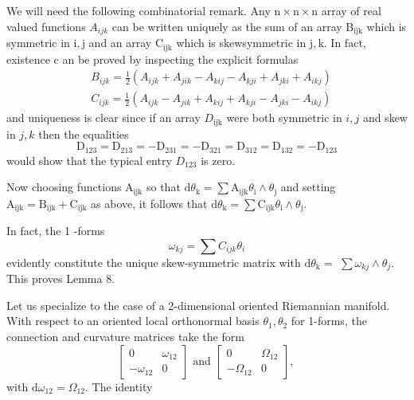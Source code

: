 \documentclass[10pt]{article}
\begin{document}
We will need the following combinatorial remark. Any $\mathrm{n} \times \mathrm{n} \times \mathrm{n}$ array of real valued functions $A_{i j k}$ can be written uniquely as the sum of an array $\mathrm{B}_{\mathrm{ijk}}$ which is symmetric in $\mathrm{i}, \mathrm{j}$ and an array $\mathrm{C}_{\mathrm{ijk}}$ which is skewsymmetric in $\mathrm{j}, \mathrm{k}$. In $\mathrm{fact}$, existence $\mathrm{c}$ an be proved by inspecting the explicit formulas
$$
\begin{aligned}
&B_{i j k}=\frac{1}{2}\left(A_{i j k}+A_{j i k}-A_{k i j}-A_{k j i}+A_{j k i}+A_{i k j}\right) \\
&C_{i j k}=\frac{1}{2}\left(A_{i j k}-A_{j i k}+A_{k i j}+A_{k j i}-A_{j k i}-A_{i k j}\right)
\end{aligned}
$$
and uniqueness is clear since if an array $D_{\mathrm{ijk}}$ were both symmetric in $i, j$ and skew in $j, k$ then the equalities
$$
\mathrm{D}_{123}=\mathrm{D}_{213}=-\mathrm{D}_{231}=-\mathrm{D}_{321}=\mathrm{D}_{312}=\mathrm{D}_{132}=-\mathrm{D}_{123}
$$
would show that the typical entry $D_{123}$ is zero.

Now choosing functions $\mathrm{A}_{\mathrm{ijk}}$ so that $\mathrm{d} \theta_{\mathrm{k}}=\sum \mathrm{A}_{\mathrm{ijk}} \theta_{\mathrm{i}} \wedge \theta_{\mathrm{j}}$ and setting $\mathrm{A}_{\mathrm{ijk}}=\mathrm{B}_{\mathrm{ijk}}+\mathrm{C}_{\mathrm{ijk}}$ as above, it follows that $\mathrm{d} \theta_{\mathrm{k}}=\sum \mathrm{C}_{\mathrm{ijk}} \theta_{\mathrm{i}} \wedge \theta_{\mathrm{j}}$.

In fact, the 1 -forms
$$
\omega_{k j}=\sum C_{i j k} \theta_{i}
$$
evidently constitute the unique skew-symmetric matrix with $\mathrm{d} \theta_{\mathrm{k}}=$ $\sum \omega_{k j} \wedge \theta_{j}$. This proves Lemma $8 .$

Let us specialize to the case of a 2-dimensional oriented Riemannian manifold. With respect to an oriented local orthonormal basis $\theta_{1}, \theta_{2}$ for 1-forms, the connection and curvature matrices take the form
$$
\left[\begin{array}{cc}
0 & \omega_{12} \\
-\omega_{12} & 0
\end{array}\right] \text { and }\left[\begin{array}{cc}
0 & \Omega_{12} \\
-\Omega_{12} & 0
\end{array}\right] \text {, }
$$
with $\mathrm{d} \omega_{12}=\Omega_{12} .$ The identity
\end{document}
